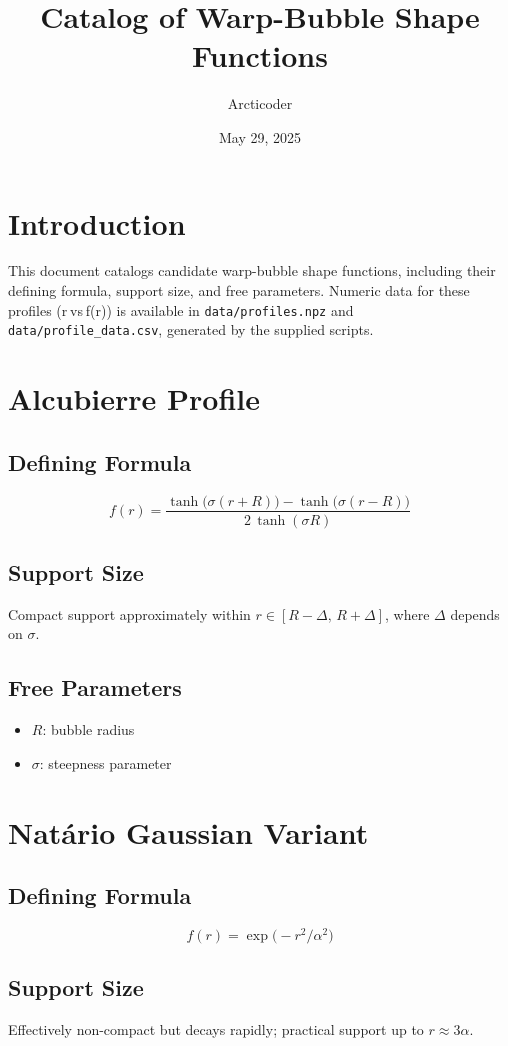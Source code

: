 \documentclass[11pt]{article}
\title{Catalog of Warp-Bubble Shape Functions}
\author{Arcticoder}
\date{May 29, 2025}
\begin{document}
\maketitle

\tableofcontents
\newpage

\section*{Introduction}
This document catalogs candidate warp-bubble shape functions, including their defining formula, support size, and free parameters.
Numeric data for these profiles (r vs f(r)) is available in \texttt{data/profiles.npz} and \texttt{data/profile_data.csv}, generated by the supplied scripts.

\section{Alcubierre Profile}
\subsection*{Defining Formula}
\[
f(r) = \frac{\tanh\bigl(\sigma (r + R)\bigr) - \tanh\bigl(\sigma (r - R)\bigr)}{2\,\tanh(\sigma R)}
\]
\subsection*{Support Size}
Compact support approximately within $r \in [R - \Delta,\, R + \Delta]$, where $\Delta$ depends on $\sigma$.
\subsection*{Free Parameters}
\begin{itemize}
  \item $R$: bubble radius
  \item $\sigma$: steepness parameter
\end{itemize}

\section{Natário Gaussian Variant}
\subsection*{Defining Formula}
\[
f(r) = \exp\!\bigl(-r^2 / \alpha^2\bigr)
\]
\subsection*{Support Size}
Effectively non-compact but decays rapidly; practical support up to $r \approx 3\alpha$.
\end{document}
